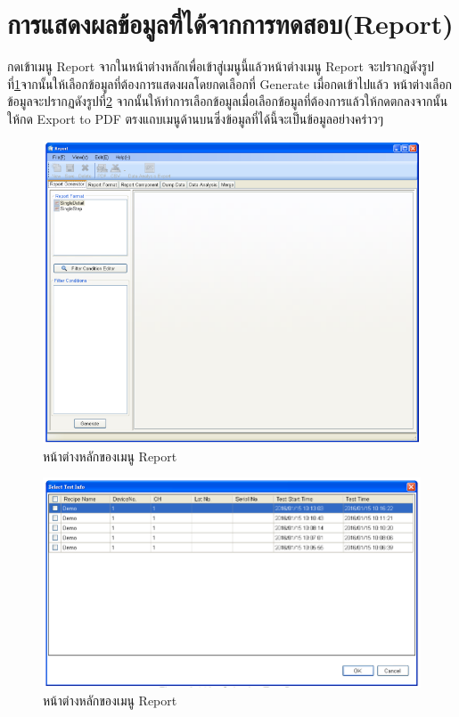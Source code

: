 \section{การแสดงผลข้อมูลที่ได้จากการทดสอบ(Report)}
กดเข้าเมนู Report จากในหน้าต่างหลักเพื่อเข้าสู่เมนูนี้แล้วหน้าต่างเมนู Report จะปรากฎดังรูปที่\ref{fig:report}จากนั้นให้เลือกข้อมูลที่ต้องการแสดงผลโดยกดเลือกที่ Generate เมื่อกดเข้าไปแล้ว
หน้าต่างเลือกข้อมูลจะปรากฏดังรูปที่\ref{fig:Selecting_data_data_analysis} จากนั้นให้ทำการเลือกข้อมูลเมื่อเลือกข้อมูลที่ต้องการแล้วให้กดตกลงจากนั้นให้กด Export to PDF
ตรงแถบเมนูด้านบนซึ่งข้อมูลที่ได้นี้จะเป็นข้อมูลอย่างคร่าวๆ
\begin{center}
	\begin{figure}[H]
		\includegraphics[width=1\linewidth]{Chapters/img/17020_Program/Report/Report_main_menu.png}
		\centering
		\captionsetup{justification=centering,margin=2cm}
		\caption{หน้าต่างหลักของเมนู Report}
		\label{fig:report}
	\end{figure}
	\begin{figure}[H]
		\includegraphics[width=1\linewidth]{Chapters/img/17020_Program/Report/Selecting_data.png}
		\centering
		\captionsetup{justification=centering,margin=2cm}
		\caption{หน้าต่างหลักของเมนู Report}
		\label{fig:Selecting_data_data_analysis}
	\end{figure}
\end{center}
